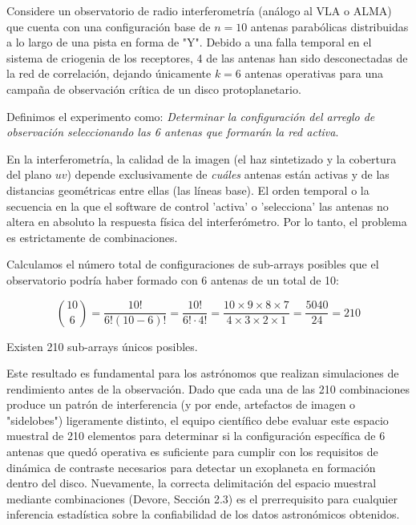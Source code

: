 Considere un observatorio de radio interferometría (análogo al VLA o ALMA) que cuenta con una configuración base de $n = 10$ antenas parabólicas distribuidas a lo largo de una pista en forma de "Y". Debido a una falla temporal en el sistema de criogenia de los receptores, 4 de las antenas han sido desconectadas de la red de correlación, dejando únicamente $k = 6$ antenas operativas para una campaña de observación crítica de un disco protoplanetario.

Definimos el experimento como: \textit{Determinar la configuración del arreglo de observación seleccionando las 6 antenas que formarán la red activa}.

En la interferometría, la calidad de la imagen (el haz sintetizado y la cobertura del plano $uv$) depende exclusivamente de \textit{cuáles} antenas están activas y de las distancias geométricas entre ellas (las líneas base). El orden temporal o la secuencia en la que el software de control 'activa' o 'selecciona' las antenas no altera en absoluto la respuesta física del interferómetro. Por lo tanto, el problema es estrictamente de combinaciones.

Calculamos el número total de configuraciones de sub-arrays posibles que el observatorio podría haber formado con 6 antenas de un total de 10:

$$ \binom{10}{6} = \frac{10!}{6!(10-6)!} = \frac{10!}{6! \cdot 4!} = \frac{10 \times 9 \times 8 \times 7}{4 \times 3 \times 2 \times 1} = \frac{5040}{24} = 210 $$

Existen 210 sub-arrays únicos posibles. 

Este resultado es fundamental para los astrónomos que realizan simulaciones de rendimiento antes de la observación. Dado que cada una de las 210 combinaciones produce un patrón de interferencia (y por ende, artefactos de imagen o "sidelobes") ligeramente distinto, el equipo científico debe evaluar este espacio muestral de 210 elementos para determinar si la configuración específica de 6 antenas que quedó operativa es suficiente para cumplir con los requisitos de dinámica de contraste necesarios para detectar un exoplaneta en formación dentro del disco. Nuevamente, la correcta delimitación del espacio muestral mediante combinaciones (Devore, Sección 2.3) es el prerrequisito para cualquier inferencia estadística sobre la confiabilidad de los datos astronómicos obtenidos.
